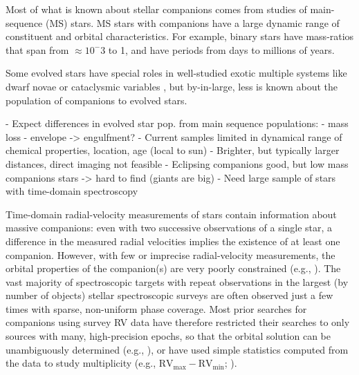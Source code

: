 \documentclass[modern, letterpaper]{aastex62}
\begin{document}

Most of what is known about stellar companions comes from studies of
main-sequence (MS) stars.
MS stars with companions have a large dynamic range of constituent and orbital
characteristics.
For example, binary stars have mass-ratios that span from $\approx 10^-3$
 to 1, and have periods from days to
millions of years.

Some evolved stars have special roles in well-studied exotic multiple systems
like dwarf novae or cataclysmic variables ,
but by-in-large, less is known about the population of companions to evolved
stars.

- Expect differences in evolved star pop. from main sequence populations:
  - mass loss
  - envelope -> engulfment?
- Current samples limited in dynamical range of chemical properties, location,
  age (local to sun)
- Brighter, but typically larger distances, direct imaging not feasible
- Eclipsing companions good, but low mass companions stars -> hard to find
  (giants are big)
- Need large sample of stars with time-domain spectroscopy


Time-domain radial-velocity measurements of stars contain information about
massive companions: even with two successive observations of a single star, a
difference in the measured radial velocities implies the existence of at least
one companion.
However, with few or imprecise radial-velocity measurements, the orbital
properties of the companion(s) are very poorly constrained (e.g.,
\citealt{Price-Whelan:2017}).
The vast majority of spectroscopic targets with repeat observations in the
largest (by number of objects) stellar spectroscopic surveys are often observed
just a few times with sparse, non-uniform phase coverage.
Most prior searches for companions using survey RV data have therefore
restricted their searches to only sources with many, high-precision epochs, so
that the orbital solution can be unambiguously determined (e.g.,
\citealt{Troup:2016}), or have used simple statistics computed from the data to
study multiplicity (e.g., $\textrm{RV}_\textrm{max} - \textrm{RV}_\textrm{min}$;
\citealt{Badenes:2017}).
\end{document}
